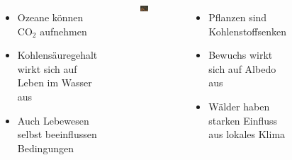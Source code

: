 \begin{frame}
\begin{columns}
\begin{figure}
		\end{figure}
			\begin{itemize}
				\item Ozeane können CO$_2$ aufnehmen
				\item Kohlensäuregehalt wirkt sich auf Leben im Wasser aus
				\item Auch Lebewesen selbst beeinflussen Bedingungen
			\end{itemize}
		\begin{figure}
			\centering
			\includegraphics[trim={0cm 0cm 0cm 3.8cm}, clip, width=\linewidth]{bilder/baeume}
		\end{figure}
			\begin{itemize}
				\item Pflanzen sind Kohlenstoffsenken
				\item Bewuchs wirkt sich auf Albedo aus
				\item Wälder haben starken Einfluss aus lokales Klima
			\end{itemize}
	\end{columns}

\end{frame}
